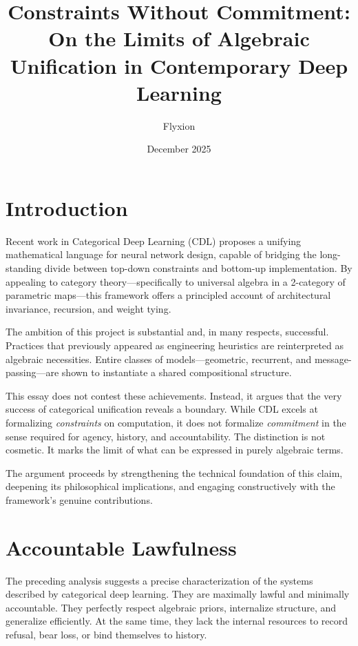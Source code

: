 \documentclass[11pt]{article}
\title{Constraints Without Commitment:\\
On the Limits of Algebraic Unification in Contemporary Deep Learning}
\author{Flyxion}
\date{December 2025}
\begin{document}
\maketitle

\section{Introduction}

Recent work in Categorical Deep Learning (CDL) proposes a unifying mathematical
language for neural network design, capable of bridging the long-standing divide
between top-down constraints and bottom-up implementation. By appealing to
category theory—specifically to universal algebra in a 2-category of parametric
maps—this framework offers a principled account of architectural invariance,
recursion, and weight tying.

The ambition of this project is substantial and, in many respects, successful.
Practices that previously appeared as engineering heuristics are reinterpreted
as algebraic necessities. Entire classes of models—geometric, recurrent, and
message-passing—are shown to instantiate a shared compositional structure.

This essay does not contest these achievements. Instead, it argues that the very
success of categorical unification reveals a boundary. While CDL excels at
formalizing \emph{constraints} on computation, it does not formalize
\emph{commitment} in the sense required for agency, history, and accountability.
The distinction is not cosmetic. It marks the limit of what can be expressed in
purely algebraic terms.

The argument proceeds by strengthening the technical foundation of this claim,
deepening its philosophical implications, and engaging constructively with the
framework’s genuine contributions.

\section{Accountable Lawfulness}

The preceding analysis suggests a precise characterization of the systems
described by categorical deep learning. They are maximally lawful and minimally
accountable. They perfectly respect algebraic priors, internalize structure, and
generalize efficiently. At the same time, they lack the internal resources to
record refusal, bear loss, or bind themselves to history.
\end{document}
